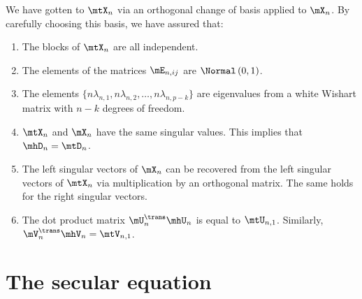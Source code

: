 We have gotten to $\mtX_n$ via an orthogonal change of basis applied to $\mX_n$.  By carefully choosing this basis, we have assured that:
\begin{enumerate}
    \item The blocks of $\mtX_n$ are all independent.
    \item The elements of the matrices $\mE_{n,ij}$ are 
        \iid $\Normal\left( 0, 1 \right)$.
    \item The elements 
        $\{ n \lambda_{n,1}, n \lambda_{n,2}, \ldots, 
            n \lambda_{n,p-k} \}$ are eigenvalues from
        a white Wishart matrix with $n-k$ degrees of freedom.
    \item $\mtX_n$ and $\mX_n$ have the same singular values.  This implies
        that $\mhD_n = \mtD_n$.
    \item The left singular vectors of $\mX_n$ can be recovered from the
        left singular vectors of $\mtX_n$ via multiplication by an orthogonal
        matrix.  The same holds for the right singular vectors.
    \item The dot product matrix $\mU_n^\trans \mhU_n$ is equal to
        $\mtU_{n,1}$.
        Similarly, $\mV_n^\trans \mhV_n = \mtV_{n,1}$.
\end{enumerate}

\section{The secular equation}

